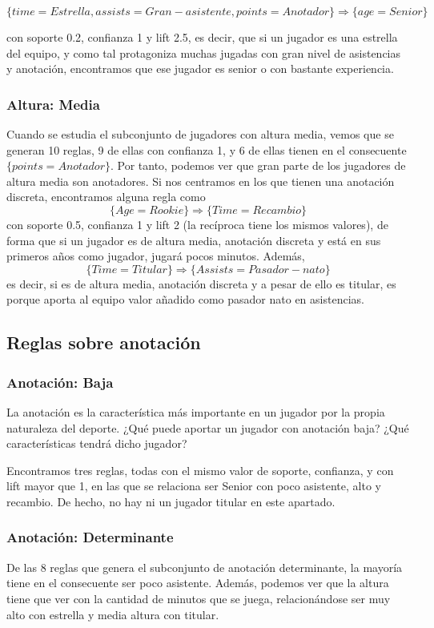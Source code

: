 $$\{time = Estrella, assists = Gran-asistente, points = Anotador\} \Rightarrow \{age = Senior\}$$

con soporte 0.2, confianza 1 y lift 2.5, es decir, que si un jugador es una estrella del equipo, y como tal protagoniza muchas jugadas con gran nivel de asistencias y anotación, encontramos que ese jugador es senior o con bastante experiencia. 

\subsubsection{Altura: Media}
Cuando se estudia el subconjunto de jugadores con altura media, vemos que se generan 10 reglas, 9 de ellas con confianza 1, y 6 de ellas tienen en el consecuente $\{points=Anotador\}$. Por tanto, podemos ver que gran parte de los jugadores de altura media son anotadores. Si nos centramos en los que tienen una anotación discreta, encontramos alguna regla como
$$\{Age=Rookie\} \Rightarrow \{Time = Recambio\}$$
con soporte 0.5, confianza 1 y lift 2 (la recíproca tiene los mismos valores), de forma que si un jugador es de altura media, anotación discreta y está en sus primeros años como jugador, jugará  pocos minutos. Además,
$$\{Time = Titular\} \Rightarrow \{Assists = Pasador-nato\}$$
es decir, si es de altura media, anotación discreta y a pesar de ello es titular, es porque aporta al equipo valor añadido como pasador nato en asistencias. 

\subsection{Reglas sobre anotación}

\subsubsection{Anotación: Baja}
La anotación es la característica más importante en un jugador por la propia naturaleza del deporte. ¿Qué puede aportar un jugador con anotación baja? ¿Qué características tendrá dicho jugador?

Encontramos tres reglas, todas con el mismo valor de soporte, confianza, y con lift mayor que 1, en las que se relaciona ser Senior con poco asistente, alto y recambio. De hecho, no hay ni un jugador titular en este apartado.

\subsubsection{Anotación: Determinante}
De las 8 reglas que genera el subconjunto de anotación determinante, la mayoría tiene en el consecuente ser poco asistente. Además, podemos ver que la altura tiene que ver con la cantidad de minutos que se juega, relacionándose ser muy alto con estrella y media altura con titular. 

